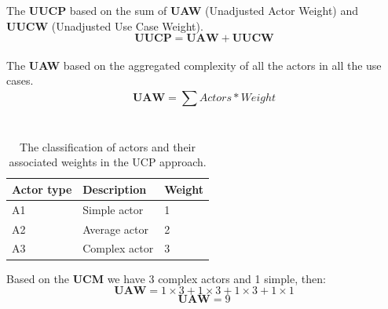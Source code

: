 \documentclass[12pt]{article}
\begin{document}
The \textbf{UUCP} based on the sum of \textbf{UAW} (Unadjusted Actor Weight)
and \textbf{UUCW} (Unadjusted Use Case Weight).\\
\begin{equation}
    \textbf{UUCP} = \textbf{UAW} + \textbf{UUCW}
\end{equation}\\

The \textbf{UAW} based on the aggregated complexity of all the actors in all the use cases.
\begin{equation}
    \textbf{UAW} = \sum^{}_{}{Actors * Weight}
\end{equation}\\
\begin{table}[h]
\centering
\caption{The classification of actors and their associated weights in the UCP approach.}
\begin{tabular}{|l|l|l|}
\hline
\textbf{Actor type} & \textbf{Description} & \textbf{Weight} \\ \hline
A1                  & Simple actor         & 1               \\ \hline
A2                  & Average actor        & 2               \\ \hline
A3                  & Complex actor        & 3               \\ \hline
\end{tabular}
\end{table}
Based on the \textbf{UCM} we have 3 complex actors and 1 simple, then:
\begin{equation}
    \textbf{UAW} = 1\times3 + 1\times3 + 1\times3 + 1\times1
\end{equation}
\begin{equation}
    \textbf{UAW} = 9
\end{equation}\\
\end{document}
